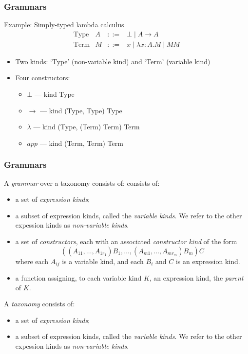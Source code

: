 \documentclass[handout]{beamer}
\begin{document}
\begin{frame}[fragile]
\frametitle{Grammars}
Example: Simply-typed lambda calculus
\[ \begin{array}{lrcl}
\text{Type} & A & ::= & \bot \mid A \rightarrow A \\
\text{Term} & M & ::= & x \mid \lambda x:A.M \mid M M
\end{array} \]

\begin{itemize}
\item
Two kinds: `Type' (non-variable kind) and `Term' (variable kind)
\item
Four constructors:
\begin{itemize}
\item
$\bot$ --- kind Type
\item
$\rightarrow$ --- kind (Type, Type) Type
\item
$\lambda$ --- kind (Type, (Term) Term) Term
\item
$app$ --- kind (Term, Term) Term
\end{itemize}
\end{itemize}
\end{frame}

\begin{frame}
\frametitle{Grammars}
A \emph{grammar} over a taxonomy consists of: consists of:
\begin{itemize}
\item a set of \emph{expression kinds};
\item a subset of expression kinds, called the \emph{variable kinds}.  We refer to the other expession kinds as \emph{non-variable kinds}.
\item a set of \emph{constructors}, each with an associated \emph{constructor kind} of the form
\begin{equation}
\label{eq:conkind}
 ((A_{11}, \ldots, A_{1r_1}) B_1, \ldots, (A_{m1}, \ldots, A_{mr_m}) B_m) C
\end{equation}
where each $A_{ij}$ is a variable kind, and each $B_i$ and $C$ is an expression kind.
\item a function assigning, to each variable kind $K$, an expression kind, the \emph{parent} of $K$.
\end{itemize}
\end{frame}

\begin{frame}[fragile]
A \emph{taxonomy } consists of:
\begin{itemize}
\item a set of \emph{expression kinds};
\item a subset of expression kinds, called the \emph{variable kinds}.  We refer to the other expession kinds as \emph{non-variable kinds}.
\end{itemize}
\end{frame}
\end{document}
